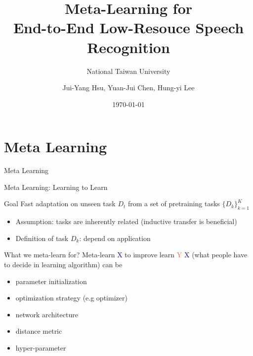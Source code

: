 \documentclass{beamer}
\title{Meta-Learning for\\ End-to-End Low-Resouce Speech Recognition}
\subtitle{\textcolor[rgb]{0.00,0.50,1.00}{{National Taiwan University}}}
\author{Jui-Yang Hsu, Yuan-Jui Chen, Hung-yi Lee}
\date{\today}
\begin{document}
\begin{frame}
\maketitle
\end{frame}

\section{Meta Learning}

\begin{frame}
	\begin{center}
    \LARGE{Meta Learning}
	\end{center}
\end{frame}

\begin{frame}[t]{Meta Learning: Learning to Learn}
  \begin{block}{Goal}
    Fast adaptation on unseen task $D_t$ from a set of pretraining tasks $\{ D_k\}^{K}_{k=1}$ 
  \end{block}

  \pause 

  \begin{itemize}
    \item Assumption: tasks are inherently related (inductive transfer is beneficial)
    \item Definition of task $D_k$: depend on application
  \end{itemize}
\end{frame}

\begin{frame}[t]{What we meta-learn for?}
  \centering Meta-learn \textcolor{navy}{X} to improve learn \textcolor{tomato}{Y}
  \pause
  \flushleft \textcolor{navy}{X} (what people have to decide in learning algorithm) can be
  \begin{itemize}
    \item parameter initialization
    \item optimization strategy (e.g optimizer)
    \item network architecture
    \item distance metric
    \item hyper-parameter
  \end{itemize}
\end{frame}
\end{document}
